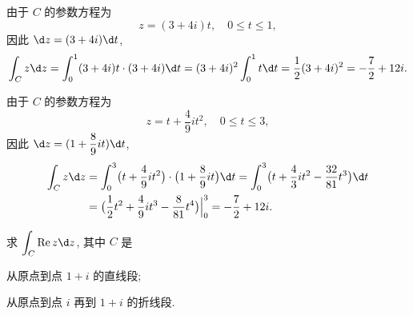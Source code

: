 \begin{solution}
  \begin{enumnopar}
    \item 由于 $C$ 的参数方程为
      \[
        z=(3+4i)t,\quad 0\le t\le 1,
      \]
      因此 $\d z=(3+4i)\d t$,
      \[
        \int_C z\d z=\int_0^1(3+4i)t\cdot(3+4i)\d t
        =(3+4i)^2\int_0^1t\d t
        =\half (3+4i)^2=-\frac72+12i.
      \]
    \item 由于 $C$ 的参数方程为
      \[
        z=t+\dfrac49it^2,\quad 0\le t\le 3,\]
      因此 $\d z=(1+\dfrac89it)\d t$,
      \begin{align*}
          \int_Cz\d z
        &=\int_0^3\bigl(t+\frac{4}9it^2\bigr)\cdot\bigl(1+\frac89it\bigr)\d t
        =\int_0^3\bigl(t+\frac43it^2-\frac{32}{81}t^3\bigr)\d t\\
        &=\bigl(\half t^2+\frac49it^3-\frac8{81}t^4\bigr)\Big|_0^3
        =-\frac72+12i.
      \end{align*}
  \end{enumnopar}
\end{solution}

\begin{example}\label{exam:re-z-integral}
  求 $\displaystyle\int_C\Re z\d z$, 其中 $C$ 是
  \begin{enumpar}
    \item 从原点到点 $1+i$ 的直线段;
    \item 从原点到点 $i$ 再到 $1+i$ 的折线段.
  \end{enumpar}
\end{example}

\begin{figure}[hbpt]
  \centering
  \begin{minipage}{.48\textwidth}
    \centering
  \end{minipage}
  \begin{minipage}{.48\textwidth}
    \centering
  \end{minipage}
\end{figure}

